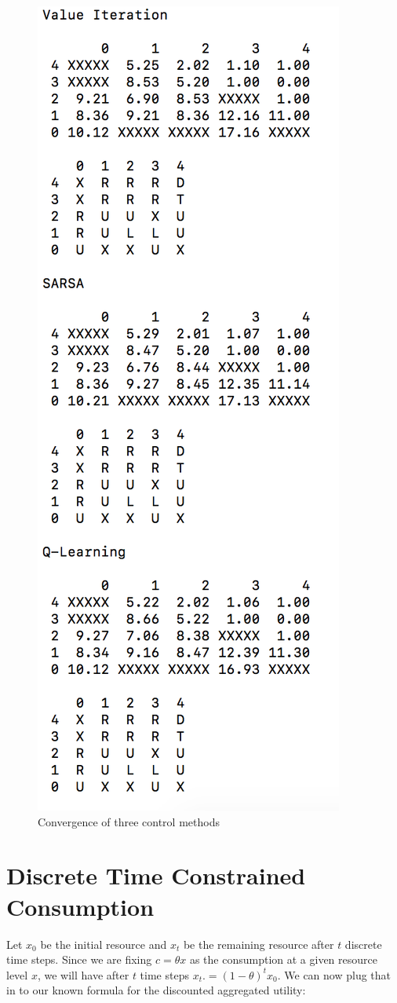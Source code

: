 \documentclass{article}[12pt]
\begin{document}
\begin{figure}
  \includegraphics[width=0.5\linewidth]{CodeOutput.png}
  \caption{Convergence of three control methods}
  \label{fig:optPol1}
\end{figure}


\section{Discrete Time Constrained Consumption}
Let $x_0$ be the initial resource and $x_t$ be the remaining resource after $t$ discrete time steps. Since we are fixing $c = \theta x$ as the consumption at a given resource level $x$, we will have after $t$ time steps $x_t. = (1-\theta)^t x_0$. We can now plug that in to our known formula for the discounted aggregated utility:
\end{document}
